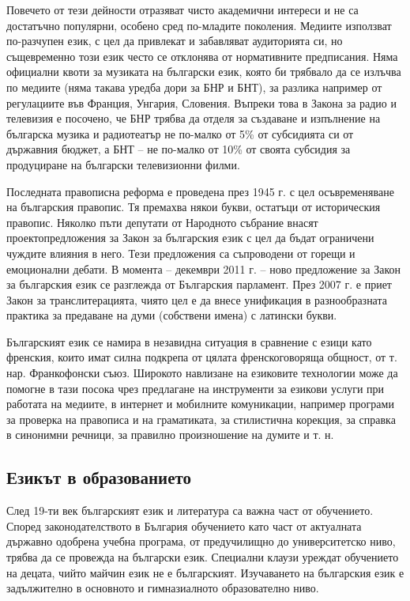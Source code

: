 \documentclass[]{../../metanetpaper}
\begin{document}
\begin{multicols}{2}
Повечето от тези дейности отразяват чисто академични
 интереси и не са достатъчно популярни, особено сред по-младите поколения. Медиите използват по-разчупен
 език, с цел да привлекат и забавляват аудиторията си, но
 същевременно този език често се отклонява от
 нормативните предписания. Няма официални квоти за
 музиката на български език, която би трябвало да се
 излъчва по медиите (няма такава уредба дори за БНР и
 БНТ), за разлика например от регулациите във Франция, Унгария, Словения. Въпреки това в Закона за радио и телевизия е посочено, че БНР трябва да отделя за създаване и изпълнение на българска музика и радиотеатър не по-малко от 5\% от субсидията си от държавния
 бюджет, а БНТ – не по-малко от 10\% от своята субсидия
 за продуциране на български телевизионни филми.

Последната правописна реформа е проведена през 1945
 г. с цел осъвременяване на българския правопис. Тя
 премахва някои букви, остатъци от историческия правопис. Няколко пъти депутати от Народното събрание внасят проектопредложения за Закон за българския език с цел да бъдат ограничени чуждите влияния в него. Тези предложения са съпроводени от горещи и емоционални дебати. В момента -- декември 2011 г. -- ново предложение за Закон за българския език се разглежда от Българския парламент. През 2007 г. е приет Закон за транслитерацията, чиято цел е да внесе унификация в разнообразната практика за предаване на
 думи (собствени имена) с латински букви.

Българският език се намира в незавидна ситуация в
 сравнение с езици като френския, които имат силна подкрепа от цялата френскоговоряща общност, от т. нар.
 Франкофонски съюз. Широкото навлизане на езиковите
 технологии може да помогне в тази посока
 чрез предлагане на инструменти за езикови услуги при
 работата на медиите, в интернет и мобилните комуникации, например програми за проверка на правописа
 и на граматиката, за стилистична корекция,
за справка в синонимни
 речници, за правилно произношение на думите и т. н.

\subsection{Езикът в образованието}

След 19-ти век българският език и литература са важна част
 от обучението. Според законодателството в България
 обучението като част от актуалната държавно одобрена
 учебна програма, от предучилищно до университетско
 ниво, трябва да се провежда на български език.
 Специални клаузи уреждат обучението на децата, чийто
 майчин език не е българският. Изучаването на
 българския език е задължително в основното и
 гимназиалното образователно ниво.


\end{multicols}
\end{document}

